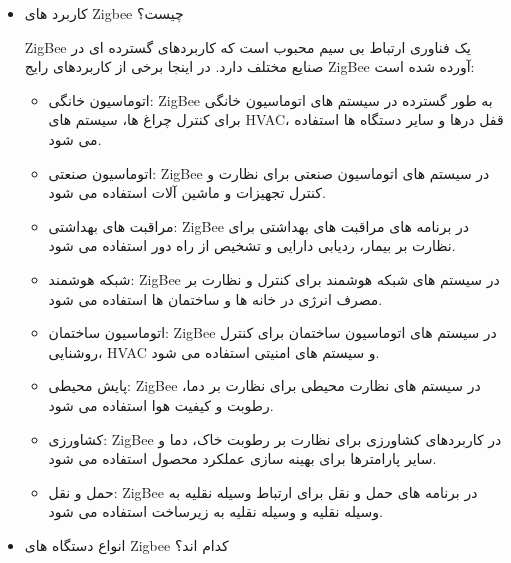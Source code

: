 \begin{itemize}
{\begin{itemize}
    \end{itemize}

}

\item {
    کاربرد های Zigbee چیست؟

    ZigBee یک فناوری ارتباط بی سیم محبوب است که کاربردهای گسترده ای در صنایع مختلف دارد. در اینجا برخی از کاربردهای رایج ZigBee آورده شده است:
    \begin{itemize}
        \item {
            اتوماسیون خانگی: ZigBee به طور گسترده در سیستم های اتوماسیون خانگی برای کنترل چراغ ها، سیستم های HVAC، قفل درها و سایر دستگاه ها استفاده می شود.
        }
        \item {
            اتوماسیون صنعتی: ZigBee در سیستم های اتوماسیون صنعتی برای نظارت و کنترل تجهیزات و ماشین آلات استفاده می شود.
        }
        \item {
            مراقبت های بهداشتی: ZigBee در برنامه های مراقبت های بهداشتی برای نظارت بر بیمار، ردیابی دارایی و تشخیص از راه دور استفاده می شود.
        }
        \item {
            شبکه هوشمند: ZigBee در سیستم های شبکه هوشمند برای کنترل و نظارت بر مصرف انرژی در خانه ها و ساختمان ها استفاده می شود.
        }
        \item {
            اتوماسیون ساختمان: ZigBee در سیستم های اتوماسیون ساختمان برای کنترل روشنایی، HVAC و سیستم های امنیتی استفاده می شود.
        }
        \item {
            پایش محیطی: ZigBee در سیستم های نظارت محیطی برای نظارت بر دما، رطوبت و کیفیت هوا استفاده می شود.
        }
        \item {
            کشاورزی: ZigBee در کاربردهای کشاورزی برای نظارت بر رطوبت خاک، دما و سایر پارامترها برای بهینه سازی عملکرد محصول استفاده می شود.
        }
        \item {
            حمل و نقل: ZigBee در برنامه های حمل و نقل برای ارتباط وسیله نقلیه به وسیله نقلیه و وسیله نقلیه به زیرساخت استفاده می شود.
        }

    \end{itemize}
}

\item {
    انواع دستگاه های Zigbee کدام اند؟

}
\end{itemize}
